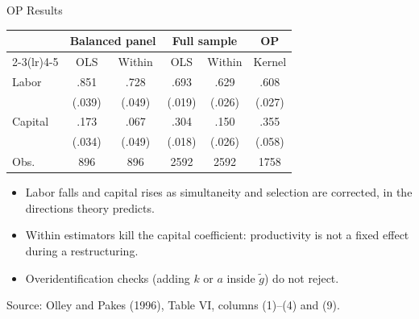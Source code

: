 \documentclass[aspectratio=169,10pt]{beamer}
\begin{document}
\begin{frame}{OP Results}
\small
\begin{center}
\renewcommand{\arraystretch}{1.15}
\begin{tabular}{lccccc}
\toprule
& \multicolumn{2}{c}{Balanced panel} & \multicolumn{2}{c}{Full sample} & OP \\
\cmidrule(lr){2-3}\cmidrule(lr){4-5}
& OLS & Within & OLS & Within & Kernel \\
\midrule
Labor & .851 & .728 & .693 & .629 & .608 \\
& (.039) & (.049) & (.019) & (.026) & (.027) \\
Capital & .173 & .067 & .304 & .150 & .355 \\
& (.034) & (.049) & (.018) & (.026) & (.058) \\
Obs. & 896 & 896 & 2592 & 2592 & 1758 \\
\bottomrule
\end{tabular}
\end{center}
\begin{itemize}
\item Labor falls and capital rises as simultaneity and selection are corrected, in the directions theory predicts.
\item Within estimators kill the capital coefficient: productivity is not a fixed effect during a restructuring.
\item Overidentification checks (adding $k$ or $a$ inside $\tilde g$) do not reject.
\end{itemize}
{\footnotesize Source: Olley and Pakes (1996), Table VI, columns (1)--(4) and (9).}
\end{frame}
\end{document}
